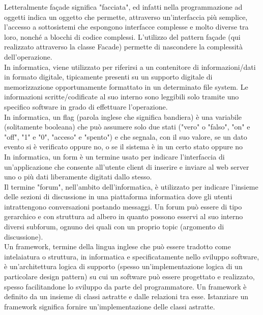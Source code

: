 \documentclass{scalatekids-article}
\begin{document}


 Letteralmente façade significa "facciata", ed infatti nella programmazione ad oggetti indica un oggetto che permette, attraverso un'interfaccia più semplice, l'accesso a sottosistemi che espongono interfacce complesse e molto diverse tra loro, nonché a blocchi di codice complessi.
L'utilizzo del pattern façade (qui realizzato attraverso la classe Facade) permette di nascondere la complessità dell'operazione. 
\\

 In informatica, viene utilizzato per riferirsi a un contenitore di informazioni/dati in formato digitale, tipicamente presenti su un supporto digitale di memorizzazione opportunamente formattato in un determinato file system.
Le informazioni scritte/codificate al suo interno sono leggibili solo tramite uno specifico software in grado di effettuare l'operazione.
\\

 In informatica, un flag (parola inglese che significa bandiera) è una variabile (solitamente booleana) che può assumere solo due stati ("vero" o "falso", "on" e "off", "1" e "0", "acceso" e "spento") e che segnala, con il suo valore, se un dato evento si è verificato oppure no, o se il sistema è in un certo stato oppure no
\\

 In informatica, un form è un termine usato per indicare l'interfaccia di un'applicazione che consente all'utente client di inserire e inviare al web server uno o più dati liberamente digitati dallo stesso.
\\

 Il termine "forum", nell'ambito dell'informatica, è utilizzato per indicare l'insieme delle sezioni di discussione in una piattaforma informatica dove gli utenti intrattengono conversazioni postando messaggi.
Un forum può essere di tipo gerarchico e con struttura ad albero in quanto possono esservi al suo interno diversi subforum, ognuno dei quali con un proprio topic (argomento di discussione).
\\

 Un framework, termine della lingua inglese che può essere tradotto come intelaiatura o struttura, in informatica e specificatamente nello sviluppo software, è un'architettura logica di supporto (spesso un'implementazione logica di un particolare design pattern) su cui un software può essere progettato e realizzato, spesso facilitandone lo sviluppo da parte del programmatore.
Un framework è definito da un insieme di classi astratte e dalle relazioni tra esse. Istanziare un framework significa fornire un'implementazione delle classi astratte. 
\\
\end{document}
